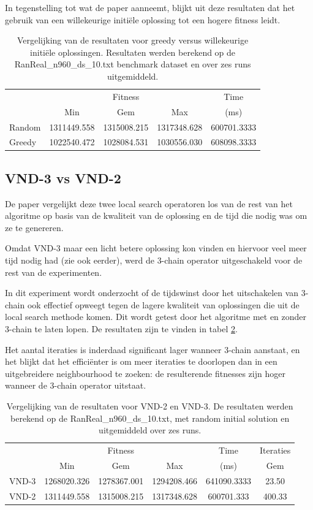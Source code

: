 \documentclass[pdftex,12pt,a4paper]{article}
\begin{document}
In tegenstelling tot wat de paper aanneemt, blijkt uit deze resultaten dat het gebruik van een willekeurige initi\"ele oplossing tot een hogere fitness leidt.

\begin{table}
\centering
\begin{tabular}{l|c|c|c|c}
& \multicolumn{3}{c|}{Fitness} & Time\\
& Min & Gem & Max & (ms) \\\hline
Random & 1311449.558 &	1315008.215 &	1317348.628 &	600701.3333\\
Greedy & 1022540.472 & 1028084.531 &	1030556.030 &	608098.3333
\end{tabular}
\caption{Vergelijking van de resultaten voor greedy versus willekeurige initi\"ele oplossingen. Resultaten werden berekend op de  RanReal\_n960\_ds\_10.txt benchmark dataset en over zes runs uitgemiddeld.}
\label{table:greedyvsrandom}
\end{table}

\subsection{VND-3 vs VND-2}
De paper vergelijkt deze twee local search operatoren los van de rest van het algoritme op basis van de kwaliteit van de oplossing en de tijd die nodig was om ze te genereren.

Omdat VND-3 maar een licht betere oplossing kon vinden en hiervoor veel meer tijd nodig had (zie ook eerder), werd de 3-chain operator uitgeschakeld voor de rest van de experimenten.

In dit experiment wordt onderzocht of de tijdswinst door het uitschakelen van 3-chain ook effectief opweegt tegen de lagere kwaliteit van oplossingen die uit de local search methode komen.
Dit wordt getest door het algoritme met en zonder 3-chain te laten lopen. De resultaten zijn te vinden in tabel \ref{table:vnd3vsvnd2}.

Het aantal iteraties is inderdaad significant lager wanneer 3-chain aanstaat, en het blijkt dat het effici\"enter is om meer iteraties te doorlopen dan in een uitgebreidere neighbourhood te zoeken: de resulterende fitnesses zijn hoger wanneer de 3-chain operator uitstaat.


\begin{table}[h]
\centering
\begin{tabular}{l|c|c|c|c|c}
& \multicolumn{3}{c|}{Fitness} & Time & Iteraties \\
& Min & Gem & Max & (ms) & Gem \\\hline 
VND-3 & 1268020.326	& 1278367.001 & 1294208.466	& 641090.3333 & 23.50\\
VND-2 & 1311449.558 &	1315008.215 &	1317348.628 &	600701.333 & 400.33
\end{tabular}
\caption{Vergelijking van de resultaten voor VND-2 en VND-3. De resultaten werden berekend op de RanReal\_n960\_ds\_10.txt, met random initial solution en uitgemiddeld over zes runs.}
\label{table:vnd3vsvnd2}
\end{table}
\end{document}
